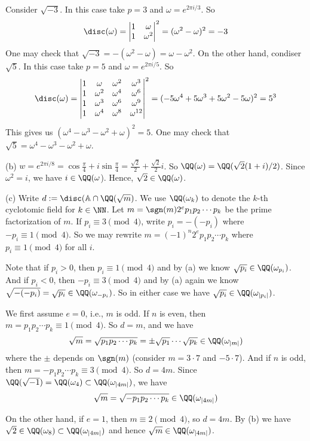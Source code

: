 \documentclass[../Chapter.tex]{subfiles}
\begin{document}
Consider $\sqrt{-3}$. In this case take $p=3$ and $\omega=e^{2\pi i/3}$. So $$\disc(\omega)=
\begin{vmatrix}
1 & \omega \\
1 & \omega^2
\end{vmatrix}^2
=(\omega^2-\omega)^2=-3$$
One may check that $\sqrt{-3}=-(\omega^2-\omega)=\omega-\omega^2$.
On the other hand, condiser $\sqrt{5}$. In this case take $p=5$ and $\omega=e^{2\pi i/5}$. So $$\disc(\omega)=
\begin{vmatrix}
1 & \omega & \omega^2 & \omega^3 \\
1 & \omega^2 & \omega^4 & \omega^6 \\
1 & \omega^3 & \omega^6 & \omega^9 \\
1 & \omega^4 & \omega^8 & \omega^{12} 
\end{vmatrix}^2=(-5\omega^4+5\omega^3+5\omega^2-5\omega)^2=5^3
$$
This gives us $(\omega^4-\omega^3-\omega^2+\omega)^2=5$. One may check that $\sqrt{5}=\omega^4-\omega^3-\omega^2+\omega$.

(b) $w=e^{2\pi i/8}=\cos\frac{\pi}{4}+i\sin\frac{\pi}{4}=\frac{\sqrt{2}}{2}+\frac{\sqrt{2}}{2}i$. So $\QQ(\omega)=\QQ(\sqrt{2}(1+i)/2)$. Since $\omega^2=i$, we have $i\in\QQ(\omega$). Hence, $\sqrt{2}\in\QQ(\omega)$. 

(c) Write $d:=\disc(\mathbb{A}\cap\QQ(\sqrt{m})$. We use $\QQ(\omega_k)$ to denote the $k$-th cyclotomic field for $k\in\NN$. Let $m=\sgn(m)2^ep_1p_2\cdots p_k$ be the prime factorization of $m$. If $p_i\equiv 3 \pmod{4}$, write $p_i=-(-p_i)$ where $-p_i\equiv 1 \pmod{4}$. So we may rewrite $m=(-1)^n2^ep_1p_2\cdots p_k$ where $p_i\equiv 1 \pmod{4}$ for all $i$.

Note that if $p_i>0$, then $p_i\equiv 1 \pmod{4}$ and by (a) we know $\sqrt{p_i}\in\QQ(\omega_{p_i})$. And if $p_i<0$, then $-p_i\equiv 3 \pmod{4}$ and by (a) again we know $\sqrt{-(-p_i)}=\sqrt{p_i} \in\QQ(\omega_{-p_i})$. So in either case we have $\sqrt{p_i}\in\QQ(\omega_{|p_i|})$.

We first assume $e=0$, i.e., $m$ is odd. If $n$ is even, then $m=p_1p_2\cdots p_k\equiv 1 \pmod{4}$. So $d=m$, and we have
$$\sqrt{m}=\sqrt{p_1p_2\cdots p_k}=\pm \sqrt{p_1}\cdots \sqrt{p_k}\in\QQ(\omega_{|m|})$$ where the $\pm$ depends on $\sgn(m)$ (consider $m=3\cdot7$ and $-5\cdot7$). And if $n$ is odd, then $m=-p_1p_2\cdots p_k\equiv 3 \pmod{4}$. So $d=4m$. Since $\QQ(\sqrt{-1})=\QQ(\omega_4)\subset\QQ(\omega_{|4m|})$, we have $$\sqrt{m}=\sqrt{-p_1p_2\cdots p_k}\in\QQ(\omega_{|4m|})$$

On the other hand, if $e=1$, then $m\equiv 2\pmod{4}$, so $d=4m$. By (b) we have $\sqrt{2}\in\QQ(\omega_8)\subset\QQ(\omega_{|4m|})$ and hence $\sqrt{m}\in\QQ(\omega_{|4m|})$.
 
\end{document}
